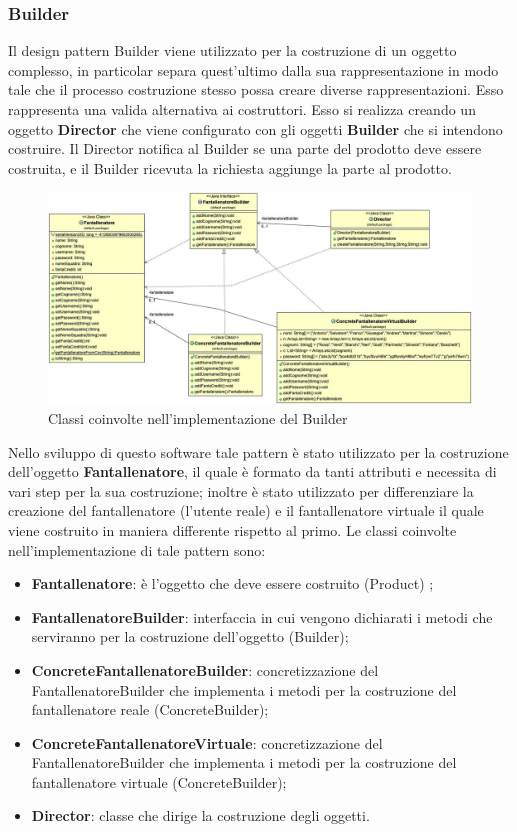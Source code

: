 \documentclass[12pt,a4paper]{article}
\begin{document}
\subsubsection{Builder}
Il design pattern Builder viene utilizzato  per la costruzione di un oggetto complesso,  in particolar separa quest'ultimo dalla sua rappresentazione in modo tale che il processo costruzione stesso possa creare diverse rappresentazioni. Esso rappresenta una valida alternativa ai costruttori. Esso si realizza creando un oggetto \textbf{Director}  che viene configurato con gli oggetti 	\textbf{Builder} che si intendono costruire. Il Director notifica al Builder se una parte del prodotto deve essere costruita, e il Builder ricevuta la richiesta aggiunge la parte al prodotto. \\
 \begin{figure}[h]
\centering
\includegraphics[width=15 cm,keepaspectratio]{Builder.jpg}
\caption{Classi coinvolte nell'implementazione del Builder}
\end{figure}
\newline
Nello sviluppo di questo software tale pattern è stato utilizzato per la costruzione dell'oggetto \textbf{Fantallenatore}, il quale è formato da tanti attributi e necessita di vari step per la sua costruzione; inoltre è stato utilizzato per differenziare la creazione del fantallenatore (l'utente reale) e il fantallenatore virtuale il quale viene costruito in maniera differente rispetto al primo. Le classi coinvolte nell'implementazione di tale pattern sono:
\begin{itemize}
\item \textbf{Fantallenatore}: è l'oggetto che deve essere costruito (Product) ;
\item \textbf{FantallenatoreBuilder}: interfaccia in cui vengono dichiarati  i metodi che serviranno per la costruzione dell'oggetto (Builder);
\item \textbf{ConcreteFantallenatoreBuilder}: concretizzazione del FantallenatoreBuilder che implementa i metodi per la costruzione del fantallenatore reale (ConcreteBuilder);
\item \textbf{ConcreteFantallenatoreVirtuale}: concretizzazione del FantallenatoreBuilder che implementa i metodi per la costruzione del fantallenatore virtuale (ConcreteBuilder);
\item \textbf{Director}: classe che dirige la costruzione degli oggetti.
\end{itemize}
\newpage
\end{document}
